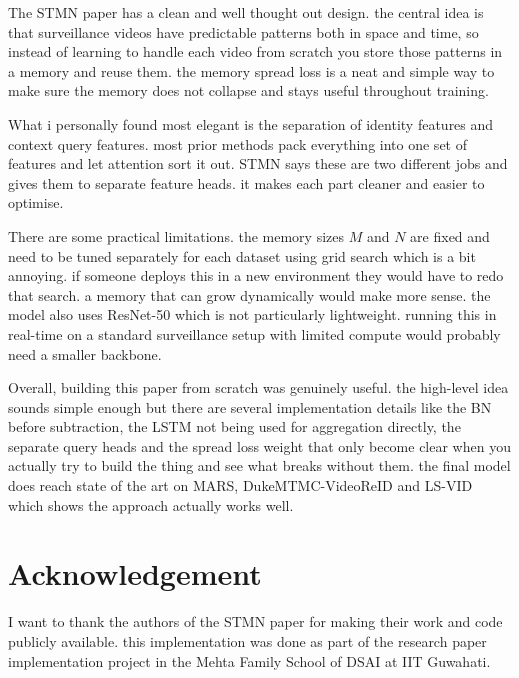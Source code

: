\documentclass[conference]{IEEEtran}
\begin{document}
The STMN paper has a clean and well thought out design. the central idea is that surveillance videos have predictable patterns both in space and time, so instead of learning to handle each video from scratch you store those patterns in a memory and reuse them. the memory spread loss is a neat and simple way to make sure the memory does not collapse and stays useful throughout training.

What i personally found most elegant is the separation of identity features and context query features. most prior methods pack everything into one set of features and let attention sort it out. STMN says these are two different jobs and gives them to separate feature heads. it makes each part cleaner and easier to optimise.

There are some practical limitations. the memory sizes $M$ and $N$ are fixed and need to be tuned separately for each dataset using grid search which is a bit annoying. if someone deploys this in a new environment they would have to redo that search. a memory that can grow dynamically would make more sense. the model also uses ResNet-50 which is not particularly lightweight. running this in real-time on a standard surveillance setup with limited compute would probably need a smaller backbone.

Overall, building this paper from scratch was genuinely useful. the high-level idea sounds simple enough but there are several implementation details like the BN before subtraction, the LSTM not being used for aggregation directly, the separate query heads and the spread loss weight that only become clear when you actually try to build the thing and see what breaks without them. the final model does reach state of the art on MARS, DukeMTMC-VideoReID and LS-VID which shows the approach actually works well.

\section*{Acknowledgement}

I want to thank the authors of the STMN paper for making their work and code publicly available. this implementation was done as part of the research paper implementation project in the Mehta Family School of DSAI at IIT Guwahati.
\end{document}
